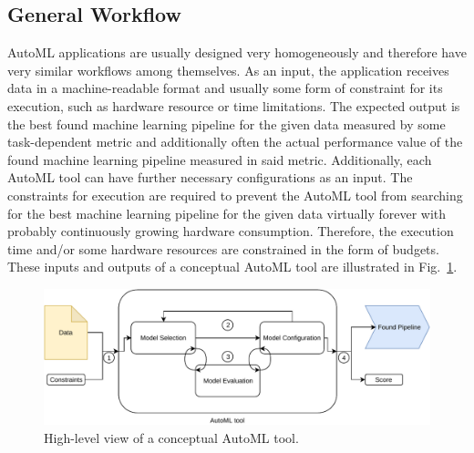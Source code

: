 \subsection{General Workflow}
\label{sec:theory:automl:workflow}
AutoML applications are usually designed very homogeneously and therefore have very similar workflows among themselves.
As an input, the application receives data in a machine-readable format and usually some form of constraint for its execution, such as hardware resource or time limitations.\newline
The expected output is the best found machine learning pipeline for the given data measured by some task-dependent metric and additionally often the actual performance value of the found machine learning pipeline measured in said metric.
Additionally, each AutoML tool can have further necessary configurations as an input.\newline
The constraints for execution are required to prevent the AutoML tool from searching for the best machine learning pipeline for the given data virtually forever with probably continuously growing hardware consumption.
Therefore, the  execution time and/or some hardware resources are constrained in the form of budgets.
These inputs and outputs of a conceptual AutoML tool are illustrated in Fig.~\ref{fig:theory:conceptualAutoMLTool}.
\begin{figure}[ht!]
    \centering
    \includegraphics[width=\textwidth]{gfx/Figures/Theory/AutoMLTool.pdf}
    \caption{High-level view of a conceptual AutoML tool.}
	\label{fig:theory:conceptualAutoMLTool}
\end{figure}

